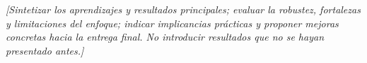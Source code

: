 \textit{[Sintetizar los aprendizajes y resultados principales; evaluar la
robustez, fortalezas y limitaciones del enfoque; indicar implicancias prácticas
y proponer mejoras concretas hacia la entrega final. No introducir resultados
que no se hayan presentado antes.]}